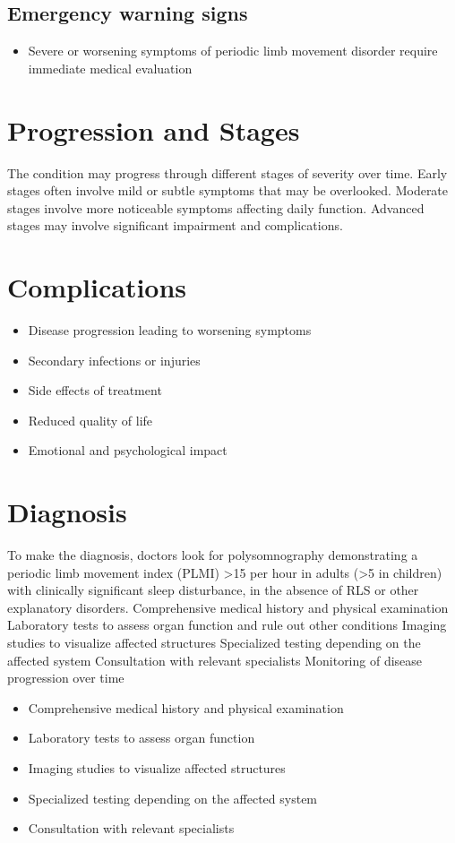 \subsection{Emergency warning signs}
\begin{itemize}[noitemsep]
  \item Severe or worsening symptoms of periodic limb movement disorder require immediate medical evaluation
\end{itemize}
\section{Progression and Stages}
The condition may progress through different stages of severity over time. Early stages often involve mild or subtle symptoms that may be overlooked. Moderate stages involve more noticeable symptoms affecting daily function. Advanced stages may involve significant impairment and complications.
\section{Complications}
\begin{itemize}[noitemsep]
  \item Disease progression leading to worsening symptoms
  \item Secondary infections or injuries
  \item Side effects of treatment
  \item Reduced quality of life
  \item Emotional and psychological impact
\end{itemize}
\section{Diagnosis}
To make the diagnosis, doctors look for polysomnography demonstrating a periodic limb movement index (PLMI) >15 per hour in adults (>5 in children) with clinically significant sleep disturbance, in the absence of RLS or other explanatory disorders. Comprehensive medical history and physical examination Laboratory tests to assess organ function and rule out other conditions Imaging studies to visualize affected structures Specialized testing depending on the affected system Consultation with relevant specialists Monitoring of disease progression over time

\begin{itemize}[noitemsep]
  \item Comprehensive medical history and physical examination
  \item Laboratory tests to assess organ function
  \item Imaging studies to visualize affected structures
  \item Specialized testing depending on the affected system
  \item Consultation with relevant specialists
\end{itemize}
